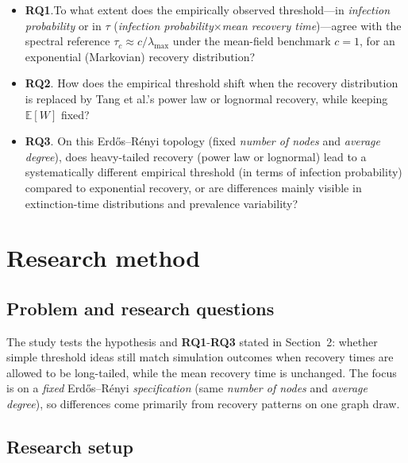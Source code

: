 \documentclass[11pt,a4paper]{article}
\begin{document}
\begin{itemize}[leftmargin=*]
  \item \textbf{RQ1}.To what extent does the empirically observed threshold---in \emph{infection probability} or in $\tau$ (\emph{infection probability}$\times$\emph{mean recovery time})---agree with the spectral reference $\tau_c \approx c/\lambda_{\max}$ under the mean-field benchmark $c=1$, for an exponential (Markovian) recovery distribution?
  \item \textbf{RQ2}. How does the empirical threshold shift when the recovery distribution is replaced by Tang et al.'s power law or lognormal recovery, while keeping $\mathbb{E}[W]$ fixed?
  \item \textbf{RQ3}. On this Erd\H{o}s--R\'enyi topology (fixed \emph{number of nodes} and \emph{average degree}), does heavy-tailed recovery (power law or lognormal) lead to a systematically different empirical threshold (in terms of infection probability) compared to exponential recovery, or are differences mainly visible in extinction-time distributions and prevalence variability?
\end{itemize}

\section{Research method}
\label{sec:research-method}

\subsection*{Problem and research questions}

The study tests the hypothesis and \textbf{RQ1}-\textbf{RQ3} stated in Section~2: whether simple threshold ideas still match simulation outcomes when recovery times are allowed to be long-tailed, while the mean recovery time is unchanged. The focus is on a \emph{fixed} Erd\H{o}s--R\'enyi \emph{specification} (same \emph{number of nodes} and \emph{average degree}), so differences come primarily from recovery patterns on one graph draw.

\subsection*{Research setup}
\end{document}
